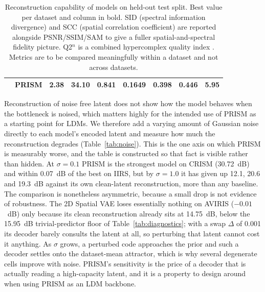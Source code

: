 \documentclass[twoside,11pt]{article}
\begin{document}
\begin{table}[t]
{\begin{tabular}{llccccccc}
      & \textbf{PRISM}         & \textbf{2.38} & \textbf{34.10} & 0.841          & 0.1649          & \textbf{0.398} & \textbf{0.446} & 5.95 \\
    \bottomrule
  \end{tabular}
  }
  \caption{Reconstruction capability of models on held-out test split. Best value per dataset and column in bold. SID (spectral information divergence) and SCC (spatial correlation coefficient) are reported alongside PSNR/SSIM/SAM to give a fuller spatial-and-spectral fidelity picture. Q2$^{n}$ is a combined hypercomplex quality index \citep{garzelli2009q2n}. Metrics are to be compared meaningfully within a dataset and not across datasets.}
  \label{tab:recon}
\end{table}

Reconstruction of noise free latent does not show how the model behaves when the bottleneck is noised, which matters highly for the intended use of PRISM as a starting point for LDMs. We therefore add a varying amount of Gaussian noise directly to each model's encoded latent and measure how much the reconstruction degrades (Table~\ref{tab:noise}). This is the one axis on which PRISM is measurably worse, and the table is constructed so that fact is visible rather than hidden. At $\sigma{=}0.1$ PRISM is the strongest model on CRISM (30.72~dB) and within 0.07~dB of the best on IIRS, but by $\sigma{=}1.0$ it has given up 12.1, 20.6 and 19.3~dB against its own clean-latent reconstruction, more than any baseline. The comparison is nonetheless asymmetric, because a small drop is not evidence of robustness. The 2D Spatial VAE loses essentially nothing on AVIRIS ($-0.01$~dB) only because its clean reconstruction already sits at 14.75~dB, below the 15.95~dB trivial-predictor floor of Table~\ref{tab:diagnostics}; with a swap $\Delta$ of 0.001 its decoder barely consults the latent at all, so perturbing that latent cannot cost it anything. As $\sigma$ grows, a perturbed code approaches the prior and such a decoder settles onto the dataset-mean attractor, which is why several degenerate cells improve with noise. PRISM's sensitivity is the price of a decoder that is actually reading a high-capacity latent, and it is a property to design around when using PRISM as an LDM backbone.
\end{document}
